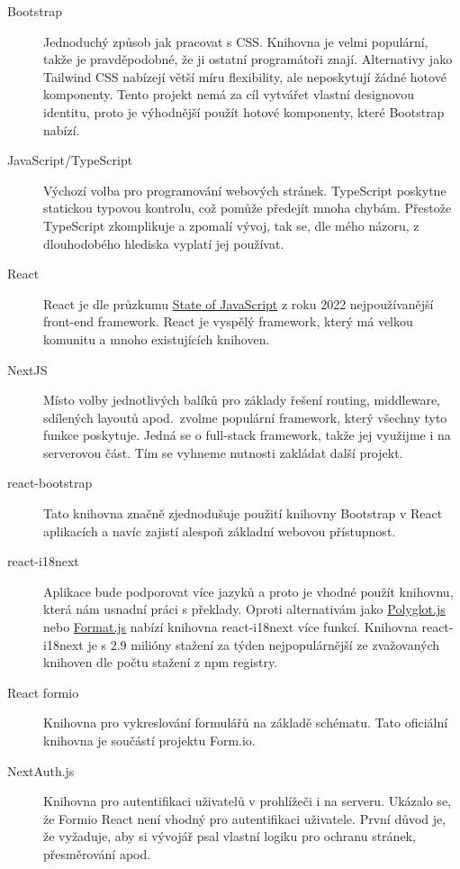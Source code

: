 \begin{description}
    \item[Bootstrap]
    Jednoduchý způsob jak pracovat s CSS\@.
    Knihovna je velmi populární, takže je pravděpodobné, že ji ostatní programátoři znají.
    Alternativy jako Tailwind CSS nabízejí větší míru flexibility, ale neposkytují žádné hotové komponenty.
    Tento projekt nemá za cíl vytvářet vlastní designovou identitu, proto je výhodnější použít hotové komponenty, které Bootstrap nabízí.
    \item[JavaScript/TypeScript]
    Výchozí volba pro programování webových stránek.
    TypeScript poskytne statickou typovou kontrolu, což pomůže předejít mnoha chybám.
    Přestože TypeScript zkomplikuje a zpomalí vývoj, tak se, dle mého názoru, z dlouhodobého hlediska vyplatí jej používat.
    \item[React]
    React je dle průzkumu \href{https://2022.stateofjs.com/en-US/libraries/front-end-frameworks/}{State of JavaScript} z roku 2022 nejpoužívanější front-end framework.
    React je vyspělý framework, který má velkou komunitu a mnoho existujících knihoven.
    \item[NextJS]
    Místo volby jednotlivých balíků pro základy řešení routing, middleware, sdílených layoutů apod.\ zvolme populární framework, který všechny tyto funkce poskytuje.
    Jedná se o full-stack framework, takže jej využijme i na serverovou část.
    Tím se vyhneme nutnosti zakládat další projekt.
    \item[react-bootstrap]
    Tato knihovna značně zjednodušuje použití knihovny Bootstrap v React aplikacích a navíc zajistí alespoň základní webovou přístupnost.
    \item[react-i18next]
    Aplikace bude podporovat více jazyků a proto je vhodné použít knihovnu, která nám usnadní práci s překlady.
    Oproti alternativám jako \href{https://github.com/airbnb/polyglot.js}{Polyglot.js} nebo \href{https://github.com/formatjs/formatjs}{Format.js} nabízí knihovna react-i18next více funkcí.
    Knihovna react-i18next je s 2.9 milióny stažení za týden nejpopulárnější ze zvažovaných knihoven dle počtu stažení z npm registry.
    \item[React formio]
    Knihovna pro vykreslování formulářů na základě schématu.
    Tato oficiální knihovna je součástí projektu Form.io.
    \item[NextAuth.js]
    Knihovna pro autentifikaci uživatelů v prohlížeči i na serveru.
    Ukázalo se, že Formio React není vhodný pro autentifikaci uživatele.
    První důvod je, že vyžaduje, aby si vývojář psal vlastní logiku pro ochranu stránek, přesměrování apod.

\end{description}
